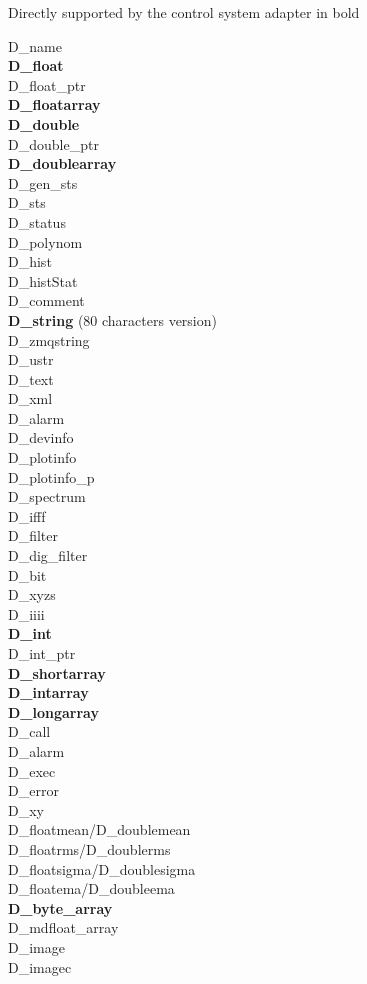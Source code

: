 \documentclass[11pt,a4paper]{scrartcl}
\begin{document}
Directly supported by the control system adapter in bold
\begin{multicols}{3}
\noindent D\_name \\
\textbf{D\_float}\\
D\_float\_ptr \\
\textbf{D\_floatarray}\\
\textbf{D\_double}\\
D\_double\_ptr \\
\textbf{D\_doublearray}\\
D\_gen\_sts \\
D\_sts \\
D\_status \\
D\_polynom \\
D\_hist \\
D\_histStat \\
D\_comment \\
\textbf{D\_string} (80 characters version)\\
D\_zmqstring \\
D\_ustr \\
D\_text \\
D\_xml \\
D\_alarm \\
D\_devinfo \\
D\_plotinfo \\
D\_plotinfo\_p \\
D\_spectrum \\
D\_ifff \\
D\_filter \\
D\_dig\_filter \\
D\_bit \\
D\_xyzs \\
D\_iiii \\
\textbf{D\_int}\\
D\_int\_ptr \\
\textbf{D\_shortarray}\\
\textbf{D\_intarray}\\
\textbf{D\_longarray}\\
D\_call \\
D\_alarm \\
D\_exec \\
D\_error \\
D\_xy \\
D\_floatmean/D\_doublemean \\
D\_floatrms/D\_doublerms \\
D\_floatsigma/D\_doublesigma \\
D\_floatema/D\_doubleema \\
\textbf{D\_byte\_array}\\
D\_mdfloat\_array \\
D\_image \\
D\_imagec
\end{multicols}
\end{document}
